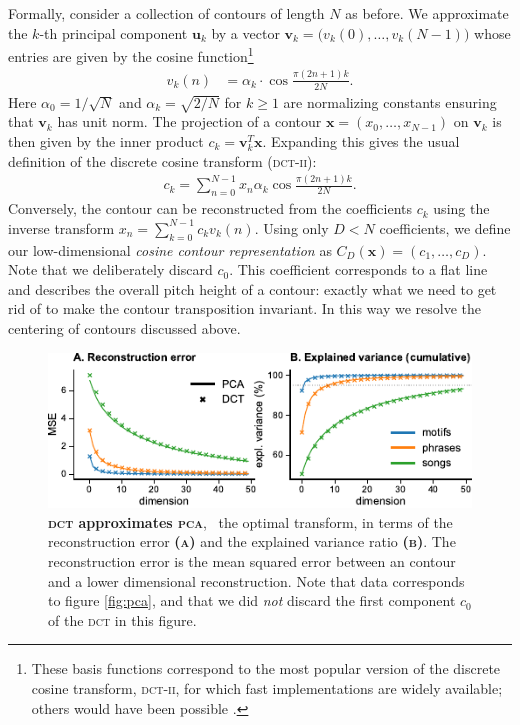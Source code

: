 \documentclass{article}
\newcommand{\vect}[1]{\mathrm{\mathbf{#1}}}
\newcommand{\vx}{\vect x}
\newcommand{\vu}{\vect u}
\newcommand{\subfiglabel}[1]{\textbf{\textsc{#1}}}
\begin{document}
Formally, consider a collection of contours of length $N$ as before.
We approximate the $k$-th principal component $\vu_k$ by a vector $\vect v_k = \bigl(v_k(0), \dots, v_k(N-1)\bigr)$ whose entries are given by the cosine function\footnote{%
    These basis functions correspond to the most popular version of the discrete cosine transform, \textsc{dct-ii}, for which fast implementations are widely available; others would have been possible \cite{Strang1999}.
    }%
\begin{align}
    v_k(n) 
        &= \alpha_k \cdot \cos \frac{\pi(2n + 1)k}{2N}.
\end{align}
Here $\alpha_0 = 1/\sqrt{N}$ and $\alpha_k = \sqrt{2/N}$ for $k \ge 1$ are normalizing constants ensuring that $\vect v_k$ has unit norm.
The projection of a contour $\vx = (x_0, \dots, x_{N-1})$ on $\vect v_k$ is then given by the inner product $c_k =  \vect v_k^T \vx$.
Expanding this gives the usual definition of the discrete cosine transform (\textsc{dct-ii}):
\begin{align}
    c_k 
    = \sum_{n=0}^{N-1}
        x_n  \alpha_k \cos \frac{\pi(2n + 1)k}{2N}.
\end{align}
Conversely, the contour can be reconstructed from the coefficients $c_k$ using the inverse transform $x_n = \sum_{k=0}^{N-1} c_k v_k(n)$.
Using only $D<N$ coefficients, we define our low-dimensional \emph{cosine contour representation} as $C_D(\vx) = (c_1, \dots, c_D)$.
Note that we deliberately discard $c_0$.
This coefficient corresponds to a flat line and describes the overall pitch height of a contour: exactly what we need to get rid of to make the contour transposition invariant.
In this way we resolve the centering of contours discussed above.


\begin{figure}[t]
    \centering
    \includegraphics{figs/fig03-evaluation.pdf}
    \caption{%
        \textbf{\textsc{dct} approximates \textsc{pca}},~%
        the optimal transform,
        in terms of the reconstruction error \subfiglabel{(a)} and the explained variance ratio \subfiglabel{(b)}.
        The reconstruction error is the mean squared error between an contour and a lower dimensional reconstruction.
        Note that data corresponds to figure \ref{fig:pca}, and that we did \emph{not} discard the first component $c_0$ of the \textsc{dct} in this figure.
    }
    \label{fig:evaluation}
\end{figure}
\end{document}
